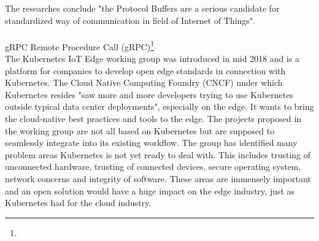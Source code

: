 The researches conclude "the Protocol Buffers are a serious candidate for standardized way of communication in field of Internet of Things"\cite{jsonVsProtobufs}.\\[5mm]
{}\\
gRPC Remote Procedure Call (gRPC)\footnote{}
{}\\
The Kubernetes IoT Edge working group\cite{IntroducingDejanBosanac:KubernetesIoTEdgeWorkingGroup} was introduced in mid 2018 and is a platform for companies to develop open edge standards in connection with Kubernetes. The Cloud Native Computing Foundry (CNCF) under which Kubernetes resides "saw more and more developers trying to use Kubernetes outside typical data center deployments"\cite{IntroducingDejanBosanac:KubernetesIoTEdgeWorkingGroup}, especially on the edge. It wants to bring the cloud-native best practices and tools to the edge. The projects proposed in the working group are not all based on Kubernetes but are supposed to seamlessly integrate into its existing workflow. The group has identified many problem areas Kubernetes is not yet ready to deal with. This includes trusting of unconnected hardware, trusting of connected devices, secure operating system, network concerns and integrity of software. These areas are immensely important and an open solution would have a huge impact on the edge industry, just as Kubernetes had for the cloud industry.



